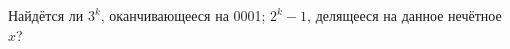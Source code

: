 \documentclass[a4paper, 12pt]{article}
\begin{document}

Найдётся ли  $3^k$, оканчивающееся на 0001;
 $2^k-1$, делящееся на данное нечётное~$x$?

\end{document}
